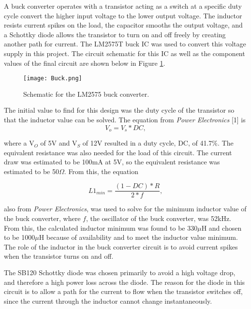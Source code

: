 \documentclass[11pt,letter]{article}
\begin{document}
A buck converter operates with a transistor acting as a switch at a specific duty cycle convert the higher input voltage to the lower output voltage. The inductor resists current spikes on the load, the capacitor smooths the output voltage, and a Schottky diode allows the transistor to turn on and off freely by creating another path for current. The LM2575T buck IC was used to convert this voltage supply in this project. The circuit schematic for this IC as well as the component values of the final circuit are shown below in Figure \ref{fig:buck}.

\begin{figure}[H]
    \centering
    \texttt{[image: Buck.png]}
    \caption{Schematic for the LM2575 buck converter.}
    \label{fig:buck}
\end{figure}

The initial value to find for this design was the duty cycle of the transistor so that the inductor value can be solved. The equation from \textit{Power Electronics} [1] is
\begin{equation}
    V_o = V_s*DC ,
\end{equation}

where a V$_O$ of 5V and V$_S$ of 12V resulted in a duty cycle, DC, of 41.7$\%$. The equivalent resistance was also needed for the load of this circuit. The current draw was estimated to be 100mA at 5V, so the equivalent resistance was estimated to be 50$\Omega$. From this, the equation

\begin{equation}
    L1_{min} = \frac{(1-DC)*R}{2*f} ,
\end{equation}

also from \textit{Power Electronics}, was used to solve for the minimum inductor value of the buck converter, where $f$, the oscillator of the buck converter, was 52kHz. From this, the calculated inductor minimum was found to be 330$\mu$H and chosen to be 1000$\mu$H because of availability and to meet the inductor value minimum. The role of the inductor in the buck converter circuit is to avoid current spikes when the transistor turns on and off.

The SB120 Schottky diode was chosen primarily to avoid a high voltage drop, and therefore a high power loss across the diode. The reason for the diode in this circuit is to allow a path for the current to flow when the transistor switches off, since the current through the inductor cannot change instantaneously.
\end{document}
